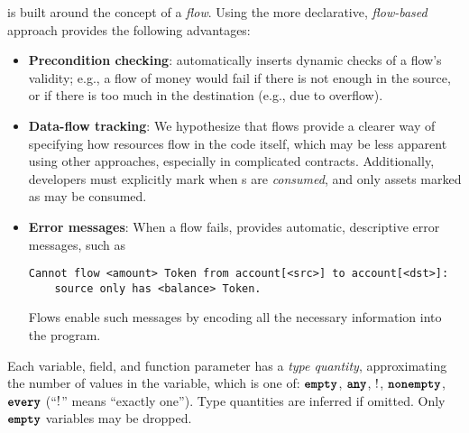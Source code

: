 \documentclass[nonacm, dvipsnames, sigconf]{acmart}
\begin{document}
\langName is built around the concept of a \emph{flow}. %
Using the more declarative, \emph{flow-based} approach provides the following advantages:
\begin{itemize}
    \item \textbf{Precondition checking}: \langName automatically inserts dynamic checks of a flow's validity; e.g., a flow of money would fail if there is not enough in the source, or if there is too much in the destination (e.g., due to overflow).
    \item \textbf{Data-flow tracking}: We hypothesize that flows provide a clearer way of specifying how resources flow in the code itself, which may be less apparent using other approaches, especially in complicated contracts. %
        Additionally, developers must explicitly mark when \assetTxt{}s are \emph{consumed}, and only assets marked as  may be consumed. %
    \item \textbf{Error messages}: When a flow fails, \langName provides automatic, descriptive error messages, such as
\begin{lstlisting}[numbers=none, basicstyle=\small\ttfamily, xleftmargin=-5.0ex]
Cannot flow <amount> Token from account[<src>] to account[<dst>]:
    source only has <balance> Token.
\end{lstlisting}
        Flows enable such messages by encoding all the necessary information into the program.%
\end{itemize}

Each variable, field, and function parameter has a \emph{type quantity}, approximating the number of values in the variable, which is one of: $\textbf{\texttt{empty}}$, $\textbf{\texttt{any}}$, $!$, $\textbf{\texttt{nonempty}}$, $\textbf{\texttt{every}}$ (``$!$'' means ``exactly one'').
Type quantities are inferred if omitted.
Only $\textbf{\texttt{empty}}$ \assetTxt variables may be dropped.
\end{document}
